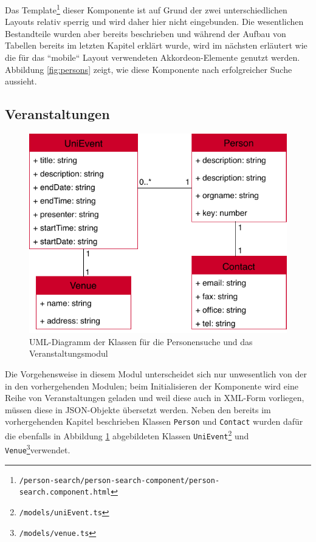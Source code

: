 Das Template\footnote{\texttt{/person-search/person-search-component/person-search.component.html}} dieser Komponente ist auf Grund der zwei unterschiedlichen Layouts relativ sperrig und wird daher hier nicht eingebunden. Die wesentlichen Bestandteile wurden aber bereits beschrieben und während der Aufbau von Tabellen bereits im letzten Kapitel erklärt wurde, wird im nächsten erläutert wie die für das ``mobile`` Layout verwendeten Akkordeon-Elemente genutzt werden. Abbildung \ref{fig:persons} zeigt, wie diese Komponente nach erfolgreicher Suche aussieht.

\subsection{Veranstaltungen}
\label{sec:prog:events}
\begin{figure}[h]
\centering
\includegraphics{gfx/Calendar}
\caption{UML-Diagramm der Klassen für die Personensuche und das Veranstaltungsmodul}
\label{fig:Calendar}
\end{figure}
Die Vorgehensweise in diesem Modul unterscheidet sich nur unwesentlich von der in den vorhergehenden Modulen; beim Initialisieren der Komponente wird eine Reihe von Veranstaltungen geladen und weil diese auch in \acs{XML}-Form vorliegen, müssen diese in \acs{JSON}-Objekte übersetzt werden. Neben den bereits im vorhergehenden Kapitel beschrieben Klassen \texttt{Person} und \texttt{Contact} wurden dafür die ebenfalls in Abbildung \ref{fig:Calendar} abgebildeten Klassen \texttt{UniEvent}\footnote{\texttt{/models/uniEvent.ts}} und \texttt{Venue}\footnote{\texttt{/models/venue.ts}}verwendet.

